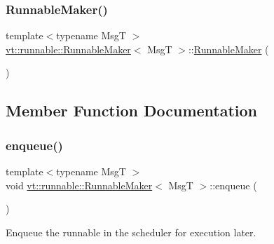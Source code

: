 \subsubsection{\texorpdfstring{Runnable\+Maker()}{RunnableMaker()}\hspace{0.1cm}{\footnotesize\ttfamily [3/3]}}
{\footnotesize\ttfamily template$<$typename MsgT $>$ \\
\hyperlink{structvt_1_1runnable_1_1_runnable_maker}{vt\+::runnable\+::\+Runnable\+Maker}$<$ MsgT $>$\+::\hyperlink{structvt_1_1runnable_1_1_runnable_maker}{Runnable\+Maker} (\begin{DoxyParamCaption}\item[{\hyperlink{structvt_1_1runnable_1_1_runnable_maker}{Runnable\+Maker}$<$ MsgT $>$ \&\&}]{ }\end{DoxyParamCaption})\hspace{0.3cm}{\ttfamily [default]}}



\subsection{Member Function Documentation}
\mbox{\label{structvt_1_1runnable_1_1_runnable_maker_a76516d824c744bdd347806012a78e19b}} 
\subsubsection{\texorpdfstring{enqueue()}{enqueue()}}
{\footnotesize\ttfamily template$<$typename MsgT $>$ \\
void \hyperlink{structvt_1_1runnable_1_1_runnable_maker}{vt\+::runnable\+::\+Runnable\+Maker}$<$ MsgT $>$\+::enqueue (\begin{DoxyParamCaption}{ }\end{DoxyParamCaption})}



Enqueue the runnable in the scheduler for execution later. 

\mbox{\label{structvt_1_1runnable_1_1_runnable_maker_accd2b512108a1ac1e686bc25791c2e5f}} 

